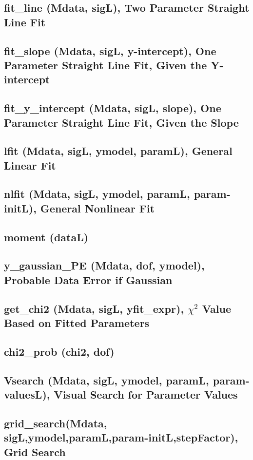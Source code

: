 \documentclass[12pt]{article}
\begin{document}
\subsection{\textbf{fit\_line (Mdata,  sigL)}, Two Parameter Straight Line Fit}
\subsection{\textbf{fit\_slope (Mdata,  sigL,  y-intercept)}, One Parameter Straight Line Fit, Given the Y-intercept}
\subsection{\textbf{fit\_y\_intercept (Mdata,  sigL,  slope)}, One Parameter Straight Line Fit, Given the Slope}
\subsection{\textbf{lfit (Mdata,  sigL,  ymodel,  paramL)}, General Linear Fit}
\subsection{\textbf{nlfit (Mdata, sigL, ymodel, paramL, param-initL)}, General Nonlinear Fit}
\subsection{\textbf{moment (dataL)}}
\subsection{\textbf{y\_gaussian\_PE (Mdata, dof, ymodel)}, Probable Data Error if Gaussian}
\subsection{\textbf{get\_chi2 (Mdata, sigL, yfit\_expr)}, $\chi^2$ Value Based on Fitted Parameters}
\subsection{\textbf{chi2\_prob (chi2, dof)}}
\subsection{\textbf{Vsearch (Mdata, sigL, ymodel, paramL, param-valuesL)}, Visual Search for Parameter Values}
\subsection{\textbf{grid\_search(Mdata, sigL,ymodel,paramL,param-initL,stepFactor)},  Grid Search}
\end{document}
